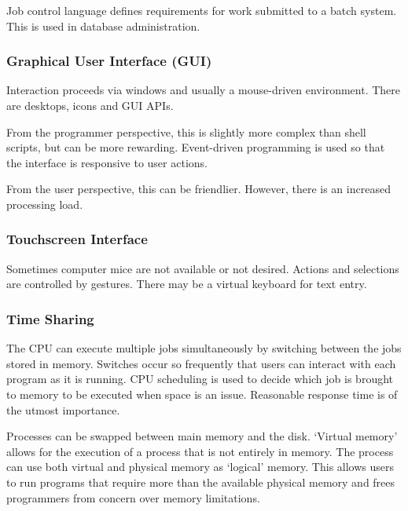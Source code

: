{Job control language defines requirements for work submitted to a batch system.
This is used in database administration.

\subsubsection{Graphical User Interface (GUI)}

Interaction proceeds via windows and usually a mouse-driven environment.
There are desktops, icons and GUI APIs.

From the programmer perspective, this is slightly more complex than shell scripts, but can be more rewarding.
Event-driven programming is used so that the interface is responsive to user actions.

From the user perspective, this can be friendlier.
However, there is an increased processing load.

\subsubsection{Touchscreen Interface}

Sometimes computer mice are not available or not desired.
Actions and selections are controlled by gestures.
There may be a virtual keyboard for text entry.

\subsubsection{Time Sharing}

The CPU can execute multiple jobs simultaneously by switching between the jobs stored in memory.
Switches occur so frequently that users can interact with each program as it is running.
CPU scheduling is used to decide which job is brought to memory to be executed when space is an issue.
Reasonable response time is of the utmost importance.

Processes can be swapped between main memory and the disk.
`Virtual memory' allows for the execution of a process that is not entirely in memory.
The process can use both virtual and physical memory as `logical' memory.
This allows users to run programs that require more than the available physical memory and frees programmers from concern over memory limitations.
}